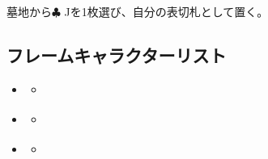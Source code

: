 \documentclass[letterpaper,10pt,dvipdfmx]{sphinxmanual}
\begin{document}
\sphinxAtStartPar
{}

\sphinxAtStartPar
墓地から{\normalsize $\clubsuit$} Jを1枚選び、自分の表切札として置く。


\subsection{フレームキャラクターリスト}
\label{\detokenize{auto/frameActionlist:characterlist-act-frame}}\label{\detokenize{auto/frameActionlist:id85}}
\begin{sphinxShadowBox}
\begin{itemize}
\item {} 
\sphinxAtStartPar
{}\label{\detokenize{auto/frameActionlist:id256}}{\hyperref[\detokenize{auto/frameActionlist:id87}]{}}
\begin{itemize}
\item {} 
\sphinxAtStartPar
{}\label{\detokenize{auto/frameActionlist:id257}}{\hyperref[\detokenize{auto/frameActionlist:char-reanimator}]{}}

\end{itemize}

\item {} 
\sphinxAtStartPar
{}\label{\detokenize{auto/frameActionlist:id258}}{\hyperref[\detokenize{auto/frameActionlist:id89}]{}}
\begin{itemize}
\item {} 
\sphinxAtStartPar
{}\label{\detokenize{auto/frameActionlist:id259}}{\hyperref[\detokenize{auto/frameActionlist:char-darklord}]{}}

\end{itemize}

\item {} 
\sphinxAtStartPar
{}\label{\detokenize{auto/frameActionlist:id260}}{\hyperref[\detokenize{auto/frameActionlist:id91}]{}}
\begin{itemize}
\item {} 
\sphinxAtStartPar
{}\label{\detokenize{auto/frameActionlist:id261}}{\hyperref[\detokenize{auto/frameActionlist:char-chariot}]{}}

\end{itemize}


\end{itemize}
\end{sphinxShadowBox}
\end{document}
